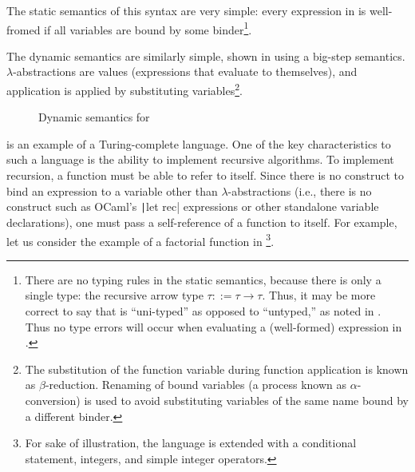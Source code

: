 The static semantics of this syntax are very simple: every expression in \ulc{} is well-fromed if all variables are bound by some binder\footnote{There are no typing rules in the static semantics, because there is only a single type: the recursive arrow type $\tau::=\tau\to\tau$. Thus, it may be more correct to say that \ulc{} is ``uni-typed'' as opposed to ``untyped,'' as noted in \cite{harper2016practical}. Thus no type errors will occur when evaluating a (well-formed) expression in \ulc{}.}.

The dynamic semantics are similarly simple, shown in  using a big-step semantics. $\lambda$-abstractions are values (expressions that evaluate to themselves), and application is applied by substituting variables\footnote{The substitution of the function variable during function application is known as $\beta$-reduction. Renaming of bound variables (a process known as $\alpha$-conversion) is used to avoid substituting variables of the same name bound by a different binder.}.

\begin{figure}
  \centering
  \begin{mdframed}
    \begin{singlespace}
    \end{singlespace}
  \end{mdframed}
  \caption{Dynamic semantics for \ulc}
  \label{fig:dynamic-semantics-ulc}
\end{figure}

\ulc{} is an example of a Turing-complete language. One of the key characteristics to such a language is the ability to implement recursive algorithms. To implement recursion, a function must be able to refer to itself. Since there is no construct to bind an expression to a variable other than $\lambda$-abstractions (i.e., there is no construct such as OCaml's \texttt|let rec| expressions or other standalone variable declarations), one must pass a self-reference of a function to itself. For example, let us consider the example of a factorial function in \ulc{}\footnote{For sake of illustration, the language is extended with a conditional statement, integers, and simple integer operators.}.

